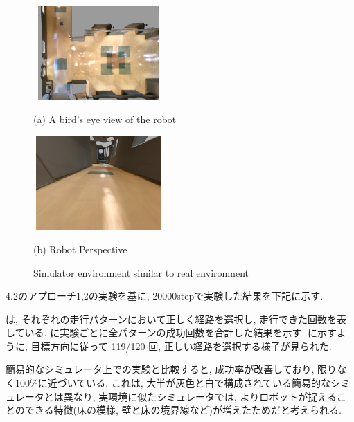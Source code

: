 \begin{figure}[h]
  \centering
  \begin{minipage}[b]{67mm}
    \centering
    \includegraphics[width=50mm, height=36mm]{images/real_sim_up.png}
    \caption*{(a) A bird's eye view of the robot}
  \end{minipage} 
  \begin{minipage}[b]{67mm}
    \centering
    \includegraphics[width=50mm, height=36mm]{images/real_sim_robot.png}
    \caption*{(b) Robot Perspective}
  \end{minipage}
  \caption{Simulator environment similar to real environment}
  \label{Fig:real_sim}
\end{figure}

4.2のアプローチ1,2の実験を基に, 20000stepで実験した結果を下記に示す.

 は, それぞれの走行パターンにおいて正しく経路を選択し, 走行できた回数を表している.  に実験ごとに全パターンの成功回数を合計した結果を示す.  に示すように, 目標方向に従って 119/120 回, 正しい経路を選択する様子が見られた.

簡易的なシミュレータ上での実験と比較すると, 成功率が改善しており, 限りなく100\%に近づいている. これは, 大半が灰色と白で構成されている簡易的なシミュレータとは異なり, 実環境に似たシミュレータでは, よりロボットが捉えることのできる特徴(床の模様, 壁と床の境界線など)が増えたためだと考えられる.

